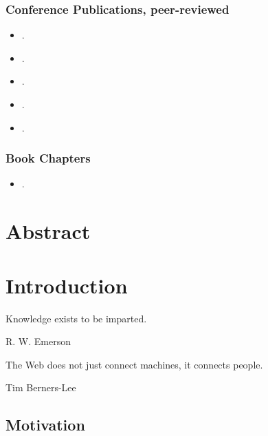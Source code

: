 \documentclass[ngerman,UKenglish,table]{scrbook}
\begin{document}
\subsection*{Conference Publications, peer-reviewed}

\begin{itemize}
\item {}.
\item {}.
\item {}.
\item {}.
\item {}.
\end{itemize}

\subsection*{Book Chapters}


\begin{itemize}
\item {}.
\end{itemize}


\chapter*{Abstract}

\tableofcontents

\mainmatter
\pagestyle{scrheadings}





\chapter{Introduction}
\label{chapter:introduction}

\epigraph{Knowledge exists to be imparted.}{R. W. Emerson}
\epigraph{The Web does not just connect machines, it connects people.}{Tim Berners-Lee}

\section{Motivation}
\label{section:motivation}
\end{document}

